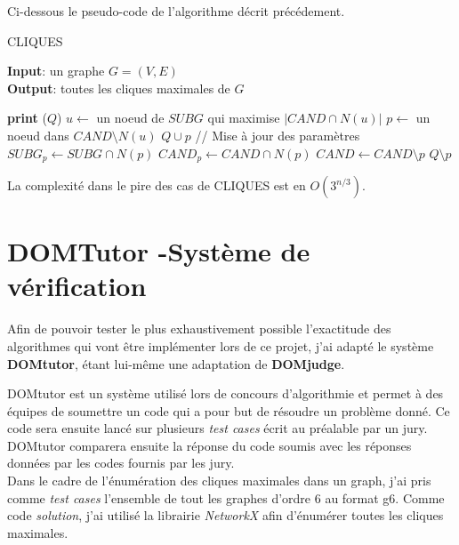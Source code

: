 \documentclass[a4paper, 12pt]{article}
\begin{document}
Ci-dessous le pseudo-code de l'algorithme décrit précédement.
\begin{algorithm}
  \caption{CLIQUES}
  \textbf{Input}: un graphe $G = (V,E)$\\
  \textbf{Output}: toutes les cliques maximales de $G$
  \begin{algorithmic}[1]
       
        \State \textbf{print} ($ Q $)
      \Else
        \State $u \gets$ un noeud de $SUBG$ qui maximise $|CAND \cap N(u)|$
          \State $p \gets$ un noeud dans $CAND \setminus N(u)$
          \State $ Q \cup p $ 
          \State // Mise à jour des paramètres
          \State $SUBG_p \gets SUBG \cap N(p)$
          \State $CAND_p \gets CAND \cap N(p)$
          \State {}
          \State $CAND \gets CAND \setminus {p}$
          \State $ Q \setminus p $ 
        \EndWhile
      \EndIf
    \EndProcedure
    \State {}
  \end{algorithmic}
\end{algorithm}

La complexité dans le pire des cas de CLIQUES est en $ O(3^{n/3}) $\cite{contetomita}.

\section{DOMTutor -Système de vérification}

Afin de pouvoir tester le plus exhaustivement possible l'exactitude des algorithmes qui vont être implémenter lors de ce projet, j'ai adapté le système \textbf{DOMtutor}\cite{domtutor}, étant lui-même une adaptation de \textbf{DOMjudge}\cite{domjudge}.

DOMtutor est un système utilisé lors de concours d'algorithmie et permet à des équipes de soumettre un code qui a pour but de résoudre un problème donné. Ce code sera ensuite lancé sur plusieurs \textit{test cases} écrit au préalable par un jury. DOMtutor comparera ensuite la réponse du code soumis avec les réponses données par les codes fournis par les jury. \\

Dans le cadre de l'énumération des cliques maximales dans un graph, j'ai pris comme \textit{test cases} l'ensemble de tout les graphes d'ordre 6 au format g6. Comme code \textit{solution}, j'ai utilisé la librairie \textit{NetworkX} afin d'énumérer toutes les cliques maximales.
\end{document}
